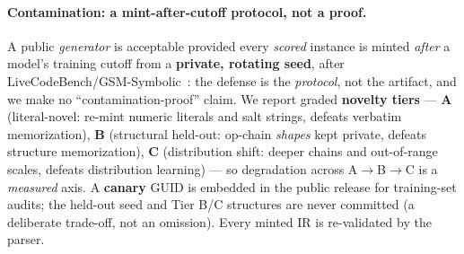 \documentclass[11pt]{article}
\begin{document}
\paragraph{Contamination: a mint-after-cutoff protocol, not a proof.} A public
\emph{generator} is acceptable provided every \emph{scored} instance is minted
\emph{after} a model's training cutoff from a \textbf{private, rotating seed}, after
LiveCodeBench/GSM-Symbolic~\citep{jain-etal-2025-livecodebench,mirzadeh-etal-2024-gsm}: the
defense is the \emph{protocol}, not the artifact, and we make no
``contamination-proof'' claim. We report graded \textbf{novelty tiers} --- \textbf{A}
(literal-novel: re-mint numeric literals and salt strings, defeats verbatim
memorization), \textbf{B} (structural held-out: op-chain \emph{shapes} kept private,
defeats structure memorization), \textbf{C} (distribution shift: deeper chains and
out-of-range scales, defeats distribution learning) --- so degradation across
A$\to$B$\to$C is a \emph{measured} axis. A \textbf{canary} GUID is embedded in the
public release for training-set audits; the held-out seed and Tier B/C structures are
never committed (a deliberate trade-off, not an omission). Every minted IR is
re-validated by the parser.
\end{document}
